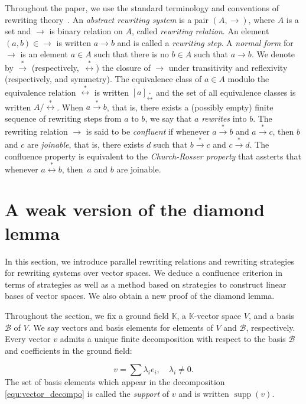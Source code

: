 \documentclass[10pt]{easychair}
\theoremstyle{definition}
\DeclareMathOperator{\supp}{supp}
\newcommand\basis{\mathscr{B}}
\newcommand\K{\mathbb{K}}
\newcommand\transRew{\overset{*}{\to}}
\newcommand\rewEquiv{\overset{*}{\leftrightarrow}}
\begin{document}
Throughout the paper, we use the standard terminology and conventions of
rewriting theory~\cite{MR1629216}. An {\em abstract rewriting system} is
a pair $(A,\to)$, where $A$ is a set and $\to$ is binary relation on $A$,
called {\em rewriting relation}. An element~$(a,b)\in\to$ is written
$a\to b$ and is called a {\em rewriting step}. A {\em normal form} for
$\to$ is an element $a\in A$ such that there is no $b\in A$ such that
$a\to b$. We denote by $\transRew$  (respectively,~$\rewEquiv$) the
closure of $\to$ under transitivity and reflexivity (respectively, and
symmetry). The equivalence class of $a\in A$ modulo the equivalence
relation $\rewEquiv$ is written $[a]_{\rewEquiv}$ and the set of all
equivalence classes is written $A/\rewEquiv$. When $a\transRew b$, that
is, there exists a (possibly empty) finite sequence of rewriting steps
from $a$ to  $b$, we say that $a$ {\em rewrites} into $b$. The rewriting
relation $\to$ is said to be {\em confluent} if whenever $a\transRew b$
and $a\transRew c$, then $b$ and $c$ are {\em joinable}, that is, there
exists $d$ such that $b\transRew c$ and $c\transRew d$. The confluence
property is equivalent to the {\em Church-Rosser property} that assterts
that whenever $a\rewEquiv b$, then~$a$ and $b$ are joinable.

\section{A weak version of the diamond lemma}
\label{sec:a_weak_version_of_the_diamond_lemma}

In this section, we introduce parallel rewriting relations and rewriting
strategies for rewriting systems over vector spaces. We deduce a
confluence criterion in terms of strategies as well as a method based on
strategies to construct linear bases of vector spaces. We also obtain a
new proof of the diamond lemma.
\medskip

Throughout the section, we fix a ground field $\K$, a $\K$-vector space
$V$, and a basis $\basis$ of $V$. We say vectors and basis elements for
elements of $V$ and $\basis$, respectively. Every vector $v$ admits a
unique finite decomposition with respect to the basis $\basis$ and
coefficients in the ground field:

\begin{equation}\label{equ:vector_decompo}
  v=\sum\lambda_ie_i,\quad\lambda_i\neq 0.
\end{equation}
The set of basis elements which appear in the decomposition
\eqref{equ:vector_decompo} is called the {\it support} of $v$ and is
written $\supp(v)$. 
\end{document}
